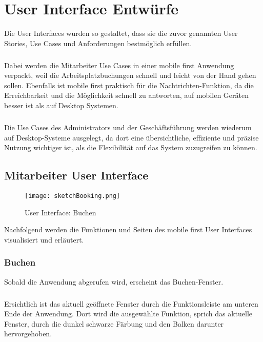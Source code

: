 \chapter{User Interface Entwürfe}

Die User Interfaces wurden so gestaltet, dass sie die zuvor genannten User Stories, Use Cases und Anforderungen bestmöglich erfüllen. 
\paragraph{}Dabei werden die Mitarbeiter Use Cases in einer mobile first Anwendung verpackt, weil die Arbeitsplatzbuchungen schnell und leicht von der Hand gehen sollen.
Ebenfalls ist mobile first praktisch für die Nachtrichten-Funktion, da die Erreichbarkeit und die Möglichkeit schnell zu antworten, auf mobilen Geräten besser ist als auf Desktop Systemen. 
\paragraph{}Die Use Cases des Administrators und der Geschäftsführung werden wiederum auf Desktop-Systeme ausgelegt, da dort eine übersichtliche, effiziente und präzise Nutzung wichtiger ist, als die Flexibilität auf das System zuzugreifen zu können. 

\newpage

\section{Mitarbeiter User Interface}

\begin{wrapfigure}[18]{r}{5.5cm}
  \texttt{[image: sketchBooking.png]}
  \caption{User Interface: Buchen}
\end{wrapfigure}

Nachfolgend werden die Funktionen und Seiten des mobile first User Interfaces visualisiert und erläutert. 

\subsection{Buchen}

Sobald die Anwendung abgerufen wird, erscheint das Buchen-Fenster.
\paragraph{}Ersichtlich ist das aktuell geöffnete Fenster durch die Funktionsleiste am unteren Ende der Anwendung. 
Dort wird die ausgewählte Funktion, sprich das aktuelle Fenster, durch die dunkel schwarze Färbung und den Balken darunter hervorgehoben.
